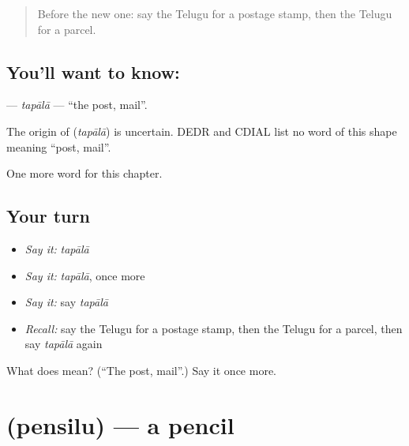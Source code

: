 \label{lesson:TE-C185-tapala}



\begin{quote}
Before the new one: say the Telugu for a postage stamp, then the Telugu for a parcel.
\end{quote}

\subsection*{You'll want to know: }
\textbf{} — \emph{tapālā} — \textquotedblleft{}the post, mail\textquotedblright{}.

\begin{cousinweb}
The origin of \textbf{} (\emph{tapālā}) is uncertain. DEDR and CDIAL list no word of this shape meaning \textquotedblleft{}post, mail\textquotedblright{}.
\end{cousinweb}

\begin{grammarlens}[title={What you've built}]
One more word for this chapter.
\end{grammarlens}

\subsection*{Your turn}
\begin{itemize}
\raggedright
  \item \emph{Say it:} \emph{tapālā}
  \item \emph{Say it:} \emph{tapālā}, once more
  \item \emph{Say it:} say \emph{tapālā}
  \item \emph{Recall:} say the Telugu for a postage stamp, then the Telugu for a parcel, then say \emph{tapālā} again
\end{itemize}

\begin{tcolorbox}[breakable,colback=teal!4,colframe=teal!35!black,title={Before you move on}]
What does  mean? (\textquotedblleft{}The post, mail\textquotedblright{}.) Say it once more.
\end{tcolorbox}
\section[\texorpdfstring{\te{పెన్సిలు} (pensilu)}{పెన్సిలు (pensilu)}]{ (pensilu) — a pencil}

\label{lesson:TE-C185-pensilu}



